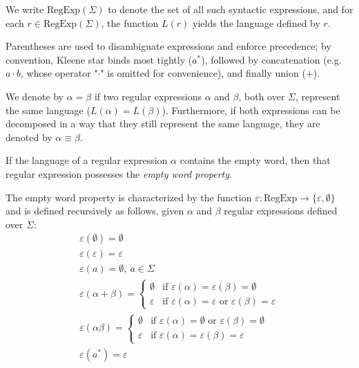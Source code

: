 We write $\text{RegExp}(\Sigma)$ to denote the set of all such syntactic expressions, and for each $r \in \text{RegExp}(\Sigma)$, the function $L(r)$ yields the language defined by $r$.

Parentheses are used to disambiguate expressions and enforce precedence; by convention, Kleene star binds most tightly ($a^*$), followed by concatenation (e.g. $a \cdot b$, whose operator "$\cdot$" is omitted for convenience), and finally union ($+$).

We denote by $\alpha = \beta$ if two regular expressions $\alpha$ and $\beta$, both over $\Sigma$, represent the same language ($L(\alpha) = L(\beta)$).
Furthermore, if both expressions can be decomposed in a way that they still represent the same language, they are denoted by $\alpha \equiv \beta$.

If the language of a regular expression $\alpha$ contains the empty word, then that regular expression possesses the \textit{empty word property}.

\begin{defn}
	The empty word property is characterized by the function $\varepsilon : \text{RegExp} \rightarrow \{ \varepsilon, \emptyset \}$ and is defined recursively as follows, given $\alpha$ and $\beta$ regular expressions defined over $\Sigma$:
	\begin{gather*}
		\varepsilon(\emptyset) = \emptyset \\
		\varepsilon(\varepsilon) = \varepsilon \\
		\varepsilon(a) = \emptyset, \: a \in \Sigma \\
		\varepsilon(\alpha + \beta) = \begin{cases}
			\emptyset & \text{if $\varepsilon(\alpha) = \varepsilon(\beta) = \emptyset$} \\
			\varepsilon & \text{if $\varepsilon(\alpha) = \varepsilon$ or $\varepsilon(\beta) = \varepsilon$}
		\end{cases} \\
		\varepsilon(\alpha \beta) = \begin{cases}
			\emptyset & \text{if $\varepsilon(\alpha) = \emptyset$ or $\varepsilon(\beta) = \emptyset$} \\
			\varepsilon & \text{if $\varepsilon(\alpha) = \varepsilon(\beta) = \varepsilon$}
		\end{cases} \\
		\varepsilon(a^*) = \varepsilon
	\end{gather*}
\end{defn}




